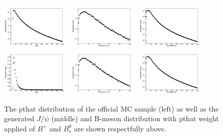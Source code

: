 \begin{figure}[h]
\begin{center}
\includegraphics[width= 0.30\textwidth]{Plots/MCReweight/GenInfo/BPpthat.png}
\includegraphics[width= 0.30\textwidth]{Plots/MCReweight/GenInfo/BPJPsiPt.png}
\includegraphics[width= 0.30\textwidth]{Plots/MCReweight/GenInfo/BPGpt.png}
\includegraphics[width= 0.30\textwidth]{Plots/MCReweight/GenInfo/Bspthat.png}
\includegraphics[width= 0.30\textwidth]{Plots/MCReweight/GenInfo/BsJPsiPt.png}
\includegraphics[width= 0.30\textwidth]{Plots/MCReweight/GenInfo/BsGpt.png}
\caption{The pthat distribution of the official MC sample (left) as well as the generated $J/\psi$ (middle) and B-meson \pt distribution with pthat weight applied of $B^{+}$ and $B^0_s$ are shown respectfully above.}
\label{fig:pthatWeightPlot}
\end{center}
\end{figure}

